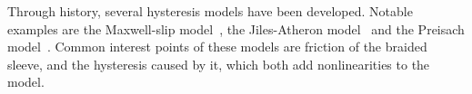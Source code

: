 Through history, several hysteresis models have been developed.
Notable examples are the Maxwell-slip model~\cite{al2005generalized},
the Jiles-Atheron model~\cite{lederer1999parameter}
and the Preisach model~\cite{ge1997generalized}. 
Common interest points of these models are friction of the braided sleeve,
and the hysteresis caused by it, which both add nonlinearities to the model.

































